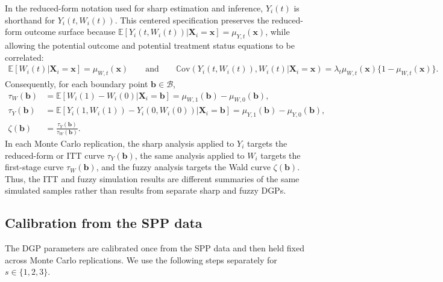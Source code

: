 \documentclass[10pt]{article}
\newcommand{\E}{\mathbb{E}}
\newcommand{\Cov}{\mathbb{C}\mathrm{ov}}
\newcommand{\bb}{\mathbf{b}}
\newcommand{\bx}{\mathbf{x}}
\newcommand{\bX}{\mathbf{X}}
\newcommand{\B}{\mathcal{B}}
\begin{document}
In the reduced-form notation used for sharp estimation and inference, $Y_i(t)$ is shorthand for $Y_i(t,W_i(t))$. This centered specification preserves the reduced-form outcome surface because $\E[Y_i(t,W_i(t))|\bX_i=\bx]=\mu_{Y,t}(\bx)$, while allowing the potential outcome and potential treatment status equations to be correlated:
\begin{align*}
    \E[W_i(t)|\bX_i=\bx] = \mu_{W,t}(\bx)
    \qquad\text{and}\qquad
    \Cov(Y_i(t,W_i(t)),W_i(t)|\bX_i=\bx) = \lambda_t\mu_{W,t}(\bx)\{1-\mu_{W,t}(\bx)\}.
\end{align*}
Consequently, for each boundary point $\bb\in\B$,
\begin{align*}
    \tau_W(\bb)
    &=
    \E[W_i(1)-W_i(0)|\bX_i=\bb]
    =
    \mu_{W,1}(\bb)-\mu_{W,0}(\bb),\\
    \tau_Y(\bb)
    &=
    \E[Y_i(1,W_i(1))-Y_i(0,W_i(0))|\bX_i=\bb]
    =
    \mu_{Y,1}(\bb)-\mu_{Y,0}(\bb),\\
    \zeta(\bb)
    &=
    \frac{\tau_Y(\bb)}{\tau_W(\bb)}.
\end{align*}
In each Monte Carlo replication, the sharp analysis applied to $Y_i$ targets the reduced-form or ITT curve $\tau_Y(\bb)$, the same analysis applied to $W_i$ targets the first-stage curve $\tau_W(\bb)$, and the fuzzy analysis targets the Wald curve $\zeta(\bb)$. Thus, the ITT and fuzzy simulation results are different summaries of the same simulated samples rather than results from separate sharp and fuzzy DGPs.

\subsection{Calibration from the SPP data}

The DGP parameters are calibrated once from the SPP data and then held fixed across Monte Carlo replications. We use the following steps separately for $s\in\{1,2,3\}$.
\end{document}
